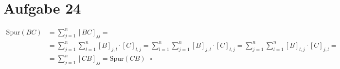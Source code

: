 \section{Aufgabe 24}

\begin{align*}
    \text{Spur}(BC) &= \sum_{j = 1}^n[BC]_{jj} = \\
                    &= \sum_{j = 1}^n\sum_{l = 1}^n[B]_{j, l} \cdot [C]_{l, j} = \sum_{l = 1}^n\sum_{j = 1}^n[B]_{j, l} \cdot [C]_{l, j} = \sum_{j = 1}^n\sum_{l = 1}^n[B]_{l, j} \cdot [C]_{j, l} = \\
                    &= \sum_{j = 1}^n[CB]_{jj} = \text{Spur}(CB) \ \ \ \square
\end{align*}
